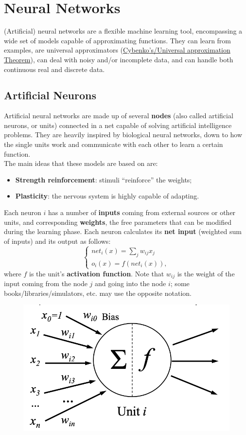 \chapter{Neural Networks}

(Artificial) neural networks are a flexible machine learning tool, encompassing a wide set of models capable of approximating functions. They can learn from examples, are universal approximators (\href{https://en.wikipedia.org/wiki/Universal_approximation_theorem}{Cybenko's/Universal approximation Theorem}), can deal with noisy and/or incomplete data, and can handle both continuous real and discrete data.

\section{Artificial Neurons}

Artificial neural networks are made up of several \textbf{nodes} (also called artificial neurons, or units) connected in a net capable of solving artificial intelligence problems. They are heavily inspired by biological neural networks, down to how the single units work and communicate with each other to learn a certain function. \\
The main ideas that these models are based on are:
\begin{itemize}
    \item \textbf{Strength reinforcement}: stimuli ``reinforce'' the weights;
    \item \textbf{Plasticity}: the nervous system is highly capable of adapting.
\end{itemize}
Each neuron $i$ has a number of \textbf{inputs} coming from external sources or other units, and corresponding \textbf{weights}, the free parameters that can be modified during the learning phase. Each neuron calculates its \textbf{net input} (weighted sum of inputs) and its output as follows:
\begin{equation*}
    \begin{cases}
        net_i(x) = \sum_j w_{ij} x_j \\
        o_i(x) = f(net_i(x)),
    \end{cases}
\end{equation*}
where $f$ is the unit's \textbf{activation function}. Note that $w_{ij}$ is the weight of the input coming from the node $j$ and going into the node $i$; some books/libraries/simulators, etc. may use the opposite notation.
\begin{figure}[ht]
    \centering
    \includegraphics[width=0.5\linewidth]{img/Neuron.png}
\end{figure}

